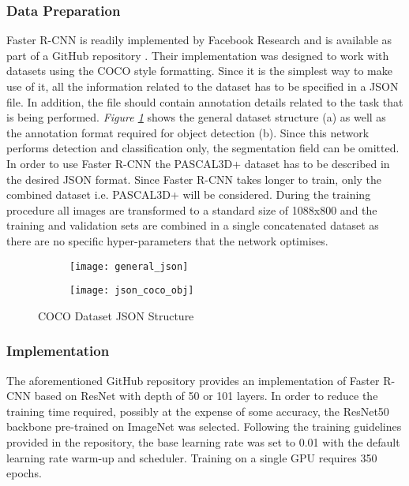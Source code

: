 \documentclass[main.tex]{subfiles}
\begin{document}
\subsubsection{Data Preparation}
Faster R-CNN is readily implemented by Facebook Research and is available as part of a GitHub repository \cite{massa2018mrcnn}. Their implementation was designed to work with datasets using the COCO style formatting. Since it is the simplest way to make use of it, all the information related to the dataset has to be specified in a JSON file. In addition, the file should contain annotation details related to the task that is being performed. \emph{Figure \ref{fig:json}} shows the general dataset structure (a) as well as the annotation format required for object detection (b). Since this network performs detection and classification only, the segmentation field can be omitted. In order to use Faster R-CNN the PASCAL3D+ dataset has to be described in the desired JSON format. Since Faster R-CNN takes longer to train, only the combined dataset i.e. PASCAL3D+ will be considered. During the training procedure all images are transformed to a standard size of 1088x800 and the training and validation sets are combined in a single concatenated dataset as there are no specific hyper-parameters that the network optimises. 
\begin{figure}[h]
\centering
\begin{subfigure}[c]{0.5\textwidth}
\centering
\texttt{[image: general\_json]}
\caption{}
\end{subfigure}%
\begin{subfigure}[c]{0.5\textwidth}
\centering
\texttt{[image: json\_coco\_obj]}
\caption{}
\end{subfigure}%
\caption{COCO Dataset JSON Structure}
\label{fig:json}
\end{figure}

\subsubsection{Implementation}
The aforementioned GitHub repository provides an implementation of Faster R-CNN based on ResNet with depth of 50 or 101 layers. In order to reduce the training time required, possibly at the expense of some accuracy, the ResNet50 backbone pre-trained on ImageNet was selected. Following the training guidelines provided in the repository, the base learning rate was set to 0.01 with the default learning rate warm-up and scheduler. Training on a single GPU requires 350 epochs.
\end{document}
